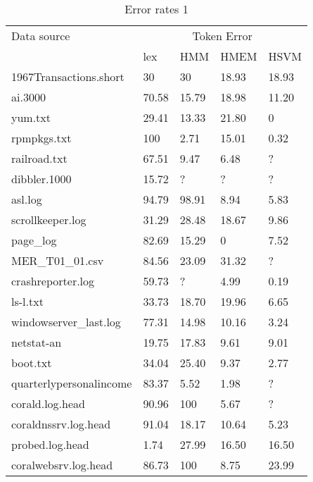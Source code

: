 \begin{table}
\begin{center}
\begin{tabular}{|l||l|l|l|l|} \hline
Data source		   & \multicolumn{4}{|c|}{Token Error} \\ \cline{2-5} 
			   & lex   & HMM   & HMEM  & HSVM \\\hline\hline
1967Transactions.short     & 30    & 30    & 18.93 & 18.93 \\ \hline
ai.3000                    & 70.58 & 15.79 & 18.98 & 11.20 \\ \hline
yum.txt                    & 29.41 & 13.33 & 21.80 & 0     \\ \hline
rpmpkgs.txt                & 100   & 2.71  & 15.01 & 0.32  \\ \hline
railroad.txt               & 67.51 & 9.47  & 6.48  & ?     \\ \hline
dibbler.1000               & 15.72 & ?     & ?     & ?     \\ \hline
asl.log                    & 94.79 & 98.91 & 8.94  & 5.83  \\ \hline
scrollkeeper.log           & 31.29 & 28.48 & 18.67 & 9.86  \\ \hline
page\_log                  & 82.69 & 15.29 & 0     & 7.52  \\ \hline
MER\_T01\_01.csv           & 84.56 & 23.09 & 31.32 & ?     \\ \hline
crashreporter.log          & 59.73 & ?     & 4.99  & 0.19  \\ \hline 
ls-l.txt                   & 33.73 & 18.70 & 19.96 & 6.65  \\ \hline
windowserver\_last.log     & 77.31 & 14.98 & 10.16 & 3.24  \\ \hline
netstat-an                 & 19.75 & 17.83 & 9.61  & 9.01  \\ \hline
boot.txt                   & 34.04 & 25.40 & 9.37  & 2.77  \\ \hline
quarterlypersonalincome    & 83.37 & 5.52  & 1.98  & ?     \\ \hline
corald.log.head            & 90.96 & 100   & 5.67  & ?     \\ \hline
coraldnssrv.log.head       & 91.04 & 18.17 & 10.64 & 5.23  \\ \hline
probed.log.head            & 1.74  & 27.99 & 16.50 & 16.50 \\ \hline
coralwebsrv.log.head       & 86.73 & 100   & 8.75  & 23.99 \\ \hline
  
\end{tabular}
\caption{Error rates 1}
\label{tab:error1}
\end{center}
\end{table}

